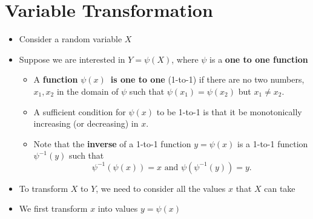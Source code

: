 \documentclass[smaller]{beamer}\usepackage[]{graphicx}\usepackage[]{color}
\newenvironment{stepitemize}{\begin{itemize}[<+->]}{\end{itemize} }
\begin{document}
\section{Variable Transformation}


\begin{frame}{\secname}
  \begin{stepitemize}
  \item Consider a random variable $X$

  \item Suppose we are interested in $Y=\psi(X)$, where $\psi $ is a \textbf{%
  one to one function}

  \begin{stepitemize}
  \item A \textbf{function }$\psi \left( x\right) $\textbf{\ is one to one}
  (1-to-1) if there are no two numbers, $x_{1},x_{2}$ in the domain of $\psi $
  such that $\psi \left( x_{1}\right) =\psi \left( x_{2}\right) $ but $%
  x_{1}\neq x_{2}$.

  \item A sufficient condition for $\psi \left( x\right) $ to be 1-to-1 is
  that it be monotonically increasing (or decreasing) in $x$.

  \item Note that the \textbf{inverse} of a 1-to-1 function $y=\psi \left(
  x\right) $ is a 1-to-1 function $\psi^{-1}\left( y\right) $ such that
  \begin{equation*}
  \psi ^{-1}\left( \psi \left( x\right) \right) =x\text{ and }\psi \left( \psi
  ^{-1}\left( y\right) \right) =y.
  \end{equation*}
  \end{stepitemize}

  \item To transform $X$ to $Y$, we need to consider all the values $x$ that $%
  X $ can take

  \item We first transform $x$ into values $y=\psi (x)$
  \end{stepitemize}
\end{frame}
\end{document}
